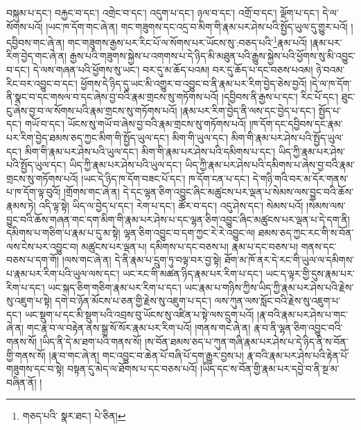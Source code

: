 བསྐུམ་པ་དང་། བརྐྱང་བ་དང་། འགྲེང་བ་དང་། འདུག་པ་དང་། ཉལ་བ་དང་། འགྲོ་བ་དང་། ལྡོག་པ་དང་། དེ་ལ་སོགས་པའོ། །ཡང་ཁ་དོག་གང་ཞེ་ན། གང་གཟུགས་དང་འདྲ་བ་མིག་གི་རྣམ་པར་ཤེས་པའི་སྤྱོད་ཡུལ་དུ་གྱུར་པའོ། །དབྱིབས་གང་ཞེ་ན། གང་གཟུགས་རྒྱས་པར་རིང་པོ་ལ་སོགས་པར་ཡོངས་སུ་:བཅད་པའི་\footnote{གཅད་པའི་  སྣར་ཐང་།  པེ་ཅིན། }རྣམ་པའོ། །རྣམ་པར་རིག་བྱེད་གང་ཞེ་ན། རྒྱས་པའི་གཟུགས་སྐྱེས་པ་འགགས་པ་དེ་ཉིད་མི་མཐུན་པའི་རྒྱུས་སྐྱེས་པའི་ཕྱོགས་སུ་མི་འབྱུང་བ་དང་། དེ་ལས་གཞན་པའི་ཕྱོགས་སུ་ཡང་། བར་དུ་མ་ཆོད་པའམ། བར་དུ་ཆོད་པ་དང་བཅས་པའམ། ཉེ་བའམ་རིང་བར་འབྱུང་བ་དང་། ཕྱོགས་དེ་ཉིད་དུ་ཡང་མི་འགྱུར་བ་འབྱུང་བ་ནི་རྣམ་པར་རིག་བྱེད་ཅེས་བྱའོ། །དེ་ལ་ཁ་དོག་ནི་སྣང་བ་དང་གསལ་བ་དང་ཞེས་བྱ་བའི་རྣམ་གྲངས་སུ་གཏོགས་པའོ། །དབྱིབས་ནི་རྒྱས་པ་དང་། རིང་པོ་དང་། ཐུང་ངུ་ཞེས་བྱ་བ་ལ་སོགས་པའི་རྣམ་གྲངས་སུ་གཏོགས་པའོ། །རྣམ་པར་རིག་བྱེད་ནི་ལས་དང་བྱེད་པ་དང་། སྤྱོད་པ་དང་། གཡོ་བ་དང་། ཡོངས་སུ་གཡོ་བ་ཞེས་བྱ་བའི་རྣམ་གྲངས་སུ་གཏོགས་པའོ། །ཁ་དོག་དང་དབྱིབས་དང་རྣམ་པར་རིག་བྱེད་ཐམས་ཅད་ཀྱང་མིག་གི་སྤྱོད་ཡུལ་དང་། མིག་གི་ཡུལ་དང་། མིག་གི་རྣམ་པར་ཤེས་པའི་སྤྱོད་ཡུལ་དང་། མིག་གི་རྣམ་པར་ཤེས་པའི་ཡུལ་དང་། མིག་གི་རྣམ་པར་ཤེས་པའི་དམིགས་པ་དང་། ཡིད་ཀྱི་རྣམ་པར་ཤེས་པའི་སྤྱོད་ཡུལ་དང་། ཡིད་ཀྱི་རྣམ་པར་ཤེས་པའི་ཡུལ་དང་། ཡིད་ཀྱི་རྣམ་པར་ཤེས་པའི་དམིགས་པ་ཞེས་བྱ་བའི་རྣམ་གྲངས་སུ་གཏོགས་པའོ། །ཡང་དེ་ཉིད་ཁ་དོག་བཟང་པོ་དང་། ཁ་དོག་ངན་པ་དང་། དེ་གཉི་གའི་བར་མ་དོར་གནས་པ་ཁ་དོག་ལྟ་བུའོ། །གྲོགས་གང་ཞེ་ན། དེ་དང་ལྷན་ཅིག་འབྱུང་ཞིང་མཚུངས་པར་ལྡན་པ་སེམས་ལས་བྱུང་བའི་ཆོས་རྣམས་ཏེ། འདི་ལྟ་སྟེ། ཡིད་ལ་བྱེད་པ་དང་། རེག་པ་དང་། ཚོར་བ་དང་། འདུ་ཤེས་དང་། སེམས་པའོ། །སེམས་ལས་བྱུང་བའི་ཆོས་གཞན་གང་དག་མིག་གི་རྣམ་པར་ཤེས་པ་དང་ལྷན་ཅིག་འབྱུང་ཞིང་མཚུངས་པར་ལྡན་པ་དེ་དག་ནི། དམིགས་པ་གཅིག་པ་རྣམ་པ་དུ་མ་སྟེ། ལྷན་ཅིག་འབྱུང་བ་དག་ཀྱང་རེ་རེ་འབྱུང་ལ། ཐམས་ཅད་ཀྱང་རང་གི་ས་བོན་ལས་ངེས་པར་འབྱུང་བ། མཚུངས་པར་ལྡན་པ། དམིགས་པ་དང་བཅས་པ། རྣམ་པ་དང་བཅས་པ། གནས་དང་བཅས་པ་དག་གོ། །ལས་གང་ཞེ་ན། དེ་ནི་རྣམ་པ་དྲུག་ཏུ་བལྟ་བར་བྱ་སྟེ། ཐོག་མ་ཁོ་ནར་དེ་རང་གི་ཡུལ་ལ་དམིགས་པ་རྣམ་པར་རིག་པའི་ཡུལ་ལས་དང་། ཡང་རང་གི་མཚན་ཉིད་རྣམ་པར་རིག་པ་དང་། ཡང་ད་ལྟར་གྱི་དུས་རྣམ་པར་རིག་པ་དང་། ཡང་སྐད་ཅིག་གཅིག་རྣམ་པར་རིག་པ་དང་། ཡང་རྣམ་པ་གཉིས་ཀྱིས་ཡིད་ཀྱི་རྣམ་པར་ཤེས་པའི་རྗེས་སུ་འཇུག་པ་སྟེ། དགེ་བ་ཉོན་མོངས་པ་ཅན་གྱི་རྗེས་སུ་འཇུག་པ་དང་། ལས་ཀུན་ལས་སློང་བའི་རྗེས་སུ་འཇུག་པ་དང་། ཡང་སྡུག་པ་དང་མི་སྡུག་པའི་འབྲས་བུ་ཡོངས་སུ་འཛིན་པ་སྟེ་ལས་དྲུག་པའོ། །རྣ་བའི་རྣམ་པར་ཤེས་པ་གང་ཞེ་ན། གང་རྣ་བ་ལ་བརྟེན་ནས་སྒྲ་སོ་སོར་རྣམ་པར་རིག་པའོ། །གནས་གང་ཞེ་ན། རྣ་བ་ནི་ལྷན་ཅིག་འབྱུང་བའི་གནས་སོ། །ཡིད་ནི་དེ་མ་ཐག་པའི་གནས་སོ། །ས་བོན་ཐམས་ཅད་པ་ཀུན་གཞི་རྣམ་པར་ཤེས་པ་དེ་ཉིད་ནི་ས་བོན་གྱི་གནས་སོ། །རྣ་བ་གང་ཞེ་ན། གང་འབྱུང་བ་ཆེན་པོ་བཞི་པོ་དག་རྒྱུར་བྱས་པ། རྣ་བའི་རྣམ་པར་ཤེས་པའི་རྟེན་པོ་གཟུགས་དང་བ་སྟེ། བསྟན་དུ་མེད་ལ་ཐོགས་པ་དང་བཅས་པའོ། །ཡིད་དང་ས་བོན་གྱི་རྣམ་པར་དབྱེ་བ་ནི་སྔ་མ་བཞིན་ནོ། །
